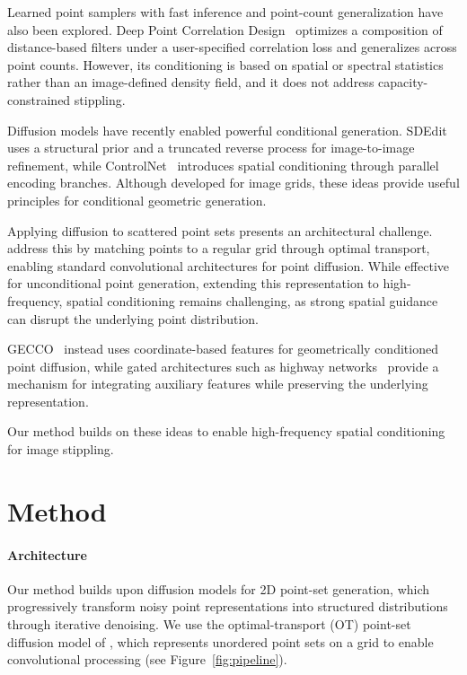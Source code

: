 \documentclass{egpubl}
\providecommand{\citet}[1]{\cite{#1}}
\begin{document}
Learned point samplers with fast inference and point-count generalization have also been explored. Deep Point Correlation Design~\cite{10.1145/3355089.3356562} optimizes a composition of distance-based filters under a user-specified correlation loss and generalizes across point counts. However, its conditioning is based on spatial or spectral statistics rather than an image-defined density field, and it does not address capacity-constrained stippling.

Diffusion models have recently enabled powerful conditional generation. SDEdit~\cite{meng2022sdeditguidedimagesynthesis} uses a structural prior and a truncated reverse process for image-to-image refinement, while ControlNet~\cite{zhang2023adding} introduces spatial conditioning through parallel encoding branches. Although developed for image grids, these ideas provide useful principles for conditional geometric generation.

Applying diffusion to scattered point sets presents an architectural challenge. \citet{10.1145/3610548.3618243} address this by matching points to a regular grid through optimal transport, enabling standard convolutional architectures for point diffusion. While effective for unconditional point generation, extending this representation to high-frequency, spatial conditioning remains challenging, as strong spatial guidance can disrupt the underlying point distribution.


GECCO~\cite{tyszkiewicz2023geccogeometricallyconditionedpointdiffusion} instead uses coordinate-based features for geometrically conditioned point diffusion, while gated architectures such as highway networks~\cite{srivastava2015highwaynetworks} provide a mechanism for integrating auxiliary features while preserving the underlying representation.  

Our method builds on these ideas to enable high-frequency spatial conditioning for image stippling.



\section{Method}


\paragraph{Architecture} Our method builds upon diffusion models for 2D point-set generation, which progressively transform noisy point representations into structured distributions through iterative denoising. We use the optimal-transport (OT) point-set diffusion model of \citet{10.1145/3610548.3618243}, which represents unordered point sets on a grid to enable convolutional processing (see Figure~\ref{fig:pipeline}).
\end{document}
